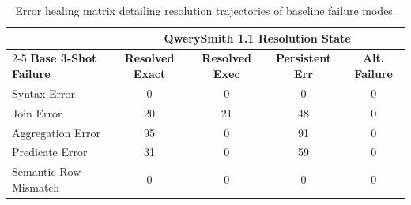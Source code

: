 \begin{table}[t]
\centering\small
\begin{tabular}{lcccc}
\toprule
 & \multicolumn{4}{c}{\textbf{QwerySmith 1.1 Resolution State}} \\
\cmidrule(lr){2-5}
\textbf{Base 3-Shot Failure} & \textbf{Resolved Exact} & \textbf{Resolved Exec} & \textbf{Persistent Err} & \textbf{Alt. Failure} \\
\midrule
Syntax Error & 0 & 0 & 0 & 0 \\
Join Error & 20 & 21 & 48 & 0 \\
Aggregation Error & 95 & 0 & 91 & 0 \\
Predicate Error & 31 & 0 & 59 & 0 \\
Semantic Row Mismatch & 0 & 0 & 0 & 0 \\
\bottomrule
\end{tabular}
\caption{Error healing matrix detailing resolution trajectories of baseline failure modes.}
\label{tab:error_migration_matrix}
\end{table}
